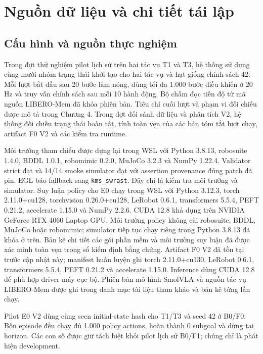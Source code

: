 \chapter{Nguồn dữ liệu và chi tiết tái lập}
\label{app:provenance}
\section{Cấu hình và nguồn thực nghiệm}
Trong đợt thử nghiệm pilot lịch sử trên hai tác vụ T1 và T3, hệ thống sử dụng cùng mười nhóm trạng thái
khởi tạo cho hai tác vụ và hạt giống chính sách 42. Mỗi lượt bắt đầu
sau 20 bước làm nóng, dùng tối đa 1.000 bước điều khiển ở 20 Hz và
truy vấn chính sách sau mỗi 10 hành động. Bộ chấm đọc tiến độ từ mã
nguồn LIBERO-Mem đã khóa phiên bản. Tiêu chí cuối lượt và phạm vi
đối chiếu được mô tả trong Chương 4.
Trong đợt đối sánh dữ liệu và phân tích V2, hệ thống đối chiếu trạng thái hoàn tất,
tính toàn vẹn của các bản tóm tắt lượt chạy, artifact F0 V2 và các kiểm tra runtime.

Môi trường tham chiếu được dựng lại trong WSL với Python 3.8.13, robosuite 1.4.0,
BDDL 1.0.1, robomimic 0.2.0, MuJoCo 3.2.3 và NumPy 1.22.4. Validator strict
đạt và 14/14 smoke simulator đạt với assertion provenance đúng patch đã pin.
EGL báo fallback sang \texttt{kms\_swrast}. Đây chỉ là kiểm tra môi trường và simulator.
Suy luận policy cho E0 chạy trong WSL với Python 3.12.3, torch 2.11.0+cu128,
torchvision 0.26.0+cu128, LeRobot 0.6.1, transformers 5.5.4, PEFT 0.21.2,
accelerate 1.15.0 và NumPy 2.2.6. CUDA 12.8 khả dụng trên NVIDIA GeForce RTX 4060
Laptop GPU. Môi trường policy không cài robosuite, BDDL, MuJoCo hoặc robomimic;
simulator tiếp tục chạy riêng trong Python 3.8.13 đã khóa ở trên. Bản kê chi tiết các gói
phần mềm và môi trường suy luận đã được xác minh toàn vẹn trong sổ kiểm định bằng chứng.
Artifact F0 V2 đã tồn tại trước cập nhật này; manifest huấn luyện ghi torch
2.11.0+cu130, LeRobot 0.6.1, transformers 5.5.4, PEFT 0.21.2 và accelerate 1.15.0.
Inference dùng CUDA 12.8 để phù hợp driver máy cục bộ. Phiên bản mô hình SmolVLA và
nguồn tác vụ LIBERO-Mem được ghi trong danh mục tài liệu tham khảo và bản kê từng lần chạy.

Pilot E0 V2 dùng cùng seen initial-state hash cho T1/T3 và seed 42 ở B0/F0.
Bốn episode đều chạy đủ 1.000 policy actions, hoàn thành 0 subgoal và dừng tại horizon.
Các con số được giữ tách biệt khỏi pilot lịch sử B0/F1; chúng chỉ là phát hiện development.

